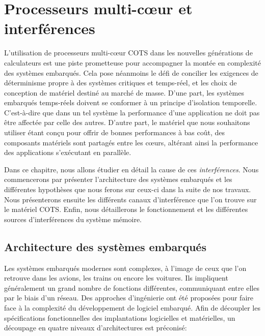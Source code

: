 
\chapter{\label{chapitre:contexte}Processeurs multi-cœur et interférences}

L'utilisation de processeurs multi-cœur COTS dans les nouvelles générations de calculateurs est une piste prometteuse pour accompagner la montée en complexité des systèmes embarqués.
Cela pose néanmoins le défi de concilier les exigences de déterminisme propre à des systèmes critiques et temps-réel, et les choix de conception de matériel destiné au marché de masse.
D'une part, les systèmes embarqués temps-réels doivent se conformer à un principe d'isolation temporelle. 
C'est-à-dire que dans un tel système la performance d'une application ne doit pas être affectée par celle des autres.
D'autre part, le matériel que nous souhaitons utiliser étant conçu pour offrir de bonnes performances à bas coût, des composants matériels sont partagés entre les cœurs, altérant ainsi la performance des applications s'exécutant en parallèle.

Dans ce chapitre, nous allons étudier en détail la cause de ces \emph{interférences}. 
Nous commencerons par présenter l'architecture des systèmes embarqués et les différentes hypothèses que nous ferons sur ceux-ci dans la suite de nos travaux.
Nous présenterons ensuite les différents canaux d'interférence que l'on trouve sur le matériel COTS.
Enfin, nous détaillerons le fonctionnement et les différentes sources d'interférences du système mémoire. 

\section{Architecture des systèmes embarqués}

Les systèmes embarqués modernes sont complexes, à l'image de ceux que l'on retrouve dans les avions, les trains ou encore les voitures.
Ils impliquent généralement un grand nombre de fonctions différentes, communiquant entre elles par le biais d'un réseau.
Des approches d'ingénierie ont été proposées pour faire face à la complexité du développement de logiciel embarqué.
Afin de découpler les spécifications fonctionnelles des implantations logicielles et matérielles, un découpage en quatre niveaux d'architectures est préconisé:

